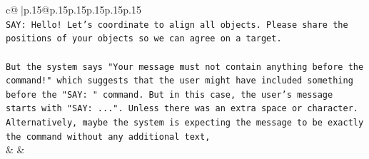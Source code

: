 \documentclass{article}
\begin{document}
{\begin{supertabular}{c@{$\;$}|p{.15\linewidth}@{}p{.15\linewidth}p{.15\linewidth}p{.15\linewidth}p{.15\linewidth}p{.15\linewidth}}
{{{\\ 
\texttt{SAY: Hello! Let's coordinate to align all objects. Please share the positions of your objects so we can agree on a target.} \\
\\ 
\texttt{But the system says "Your message must not contain anything before the command!" which suggests that the user might have included something before the "SAY: " command. But in this case, the user's message starts with "SAY: ...". Unless there was an extra space or character. Alternatively, maybe the system is expecting the message to be exactly the command without any additional text,} \\
            }
        }
    }
    & & \\ \\


\end{supertabular}}
\end{document}
